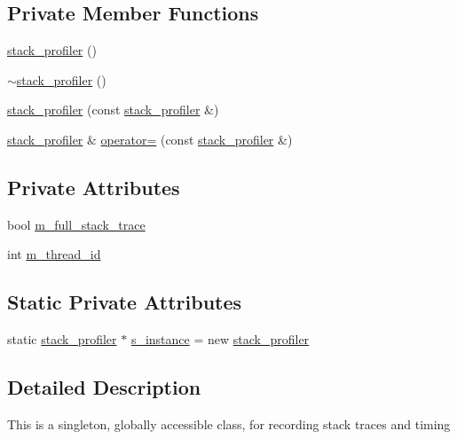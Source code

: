 \subsection*{Private Member Functions}
\begin{DoxyCompactItemize}
\item 
\hyperlink{classlbann_1_1stack__profiler_aee22d226f565eb88cc877570ca818033}{stack\+\_\+profiler} ()
\item 
\hyperlink{classlbann_1_1stack__profiler_a57329b6f2822f91e6dad13b19bcc81d9}{$\sim$stack\+\_\+profiler} ()
\item 
\hyperlink{classlbann_1_1stack__profiler_af52b4bc426a0728860b00a4fb7fd500f}{stack\+\_\+profiler} (const \hyperlink{classlbann_1_1stack__profiler}{stack\+\_\+profiler} \&)
\item 
\hyperlink{classlbann_1_1stack__profiler}{stack\+\_\+profiler} \& \hyperlink{classlbann_1_1stack__profiler_adac8efbe72cf9186a726798dc4efe91a}{operator=} (const \hyperlink{classlbann_1_1stack__profiler}{stack\+\_\+profiler} \&)
\end{DoxyCompactItemize}
\subsection*{Private Attributes}
\begin{DoxyCompactItemize}
\item 
bool \hyperlink{classlbann_1_1stack__profiler_a7dd8bf137ea417ecf54537d64c6d296a}{m\+\_\+full\+\_\+stack\+\_\+trace}
\item 
int \hyperlink{classlbann_1_1stack__profiler_a1bd742927294507fe67184cb4f47b86c}{m\+\_\+thread\+\_\+id}
\end{DoxyCompactItemize}
\subsection*{Static Private Attributes}
\begin{DoxyCompactItemize}
\item 
static \hyperlink{classlbann_1_1stack__profiler}{stack\+\_\+profiler} $\ast$ \hyperlink{classlbann_1_1stack__profiler_a7a1803ee126dfb5a215c5966458451fd}{s\+\_\+instance} = new \hyperlink{classlbann_1_1stack__profiler}{stack\+\_\+profiler}
\end{DoxyCompactItemize}


\subsection{Detailed Description}
This is a singleton, globally accessible class, for recording stack traces and timing 

